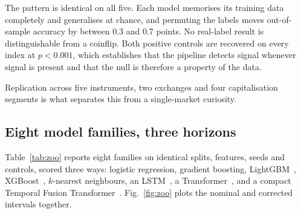 \documentclass[conference]{IEEEtran}
\begin{document}
The pattern is identical on all five. Each model memorises its training data
completely and generalises at chance, and permuting the labels moves
out-of-sample accuracy by between 0.3 and 0.7 points. No real-label result is
distinguishable from a coinflip. Both positive controls are recovered on every
index at $p < 0.001$, which establishes that the pipeline detects signal
whenever signal is present and that the null is therefore a property of the
data.

Replication across five instruments, two exchanges and four capitalisation
segments is what separates this from a single-market curiosity.

\subsection{Eight model families, three horizons}

Table~\ref{tab:zoo} reports eight families on identical splits, features, seeds
and controls, scored three ways: logistic regression, gradient boosting,
LightGBM~\cite{ke2017}, XGBoost~\cite{chen2016}, $k$-nearest neighbours, an LSTM~\cite{hochreiter1997}, a
Transformer~\cite{vaswani2017}, and a compact Temporal Fusion
Transformer~\cite{lim2021}. Fig.~\ref{fig:zoo} plots the nominal and corrected
intervals together.
\end{document}
